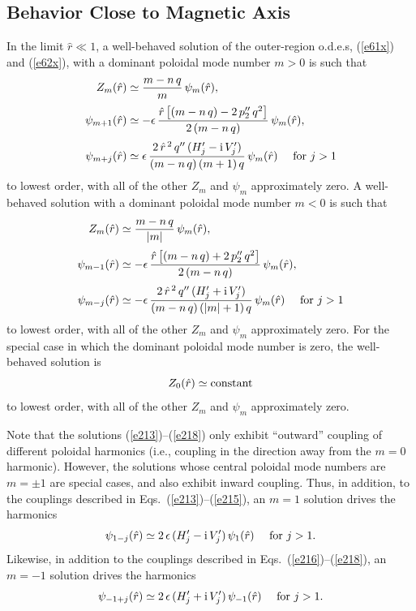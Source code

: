 \documentclass[12pt,prb,aps]{revtex4-1}
\begin{document}
\subsection{Behavior Close to Magnetic Axis}\label{axis}
In the limit $\hat{r}\ll 1$,  a well-behaved solution of the outer-region o.d.e.s, (\ref{e61x}) and (\ref{e62x}), with a dominant poloidal
mode number $m>0$ is such that\,\cite{am1}
\begin{align}\label{e213}
Z_m(\hat{r})&\simeq \frac{m-n\,q}{m}\,\psi_m(\hat{r}),\\[0.5ex]
\psi_{m+1}(\hat{r})&\simeq- \epsilon\,\frac{\hat{r}\left[(m-n\,q)-2\,p_2''\,q^2\right]}{2\,(m-n\,q)}\,\psi_m(\hat{r}),\\[0.5ex]
\psi_{m+j} (\hat{r})&\simeq 
\epsilon\,\frac{2\,\hat{r}^{\,2}\,q''\,(H_j'-{\rm i}\,V_j')}{(m-n\,q)\,(m+1)\,q}\,\psi_m(\hat{r})\mbox{~~~~for $j>1$}\label{e215}
\end{align}
to lowest order, with all of the other $Z_m$ and $\psi_m$ approximately zero. 
A well-behaved solution with a dominant poloidal mode number $m<0$ is such that 
\begin{align}
Z_m(\hat{r})&\simeq \frac{m-n\,q}{|m|}\,\psi_m(\hat{r}),\label{e216}\\[0.5ex]
\psi_{m-1}(\hat{r})&\simeq -\epsilon\,\frac{\hat{r}\left[(m-n\,q)+2\,p_2''\,q^2\right]}{2\,(m-n\,q)}\,\psi_m(\hat{r}),\\[0.5ex]
\psi_{m-j} (\hat{r})&\simeq 
-\epsilon\,\frac{2\,\hat{r}^{\,2}\,q''\,(H_j'+{\rm i}\,V_j')}{(m-n\,q)\,(|m|+1)\,q}\,\psi_m(\hat{r})\mbox{~~~~for $j>1$}\label{e218}
\end{align}
to lowest order, with all of the other $Z_m$ and $\psi_m$ approximately zero. For the special case in which the dominant poloidal
mode number is zero, the well-behaved solution is
\begin{equation}
Z_0(\hat{r})\simeq {\rm constant}
\end{equation}
to lowest order, with all of the other $Z_m$ and $\psi_m$ approximately zero. 

Note that the solutions (\ref{e213})--(\ref{e218}) only exhibit ``outward'' coupling of different poloidal harmonics
(i.e., coupling in the direction away from the $m=0$ harmonic). However, the solutions whose central poloidal
mode numbers are $m=\pm 1$ are special cases, and also exhibit inward coupling. Thus, in addition, to the
couplings described in Eqs.~(\ref{e213})--(\ref{e215}), an $m=1$ solution drives the harmonics
\begin{equation}
\psi_{1-j}(\hat{r})\simeq 2\,\epsilon\,(H_j'-{\rm i}\,V_j')\,\psi_1(\hat{r})\mbox{~~~~for $j>1$}.
\end{equation}
Likewise, in addition to the couplings described in Eqs.~(\ref{e216})--(\ref{e218}), an $m=-1$ solution drives the
harmonics
\begin{equation}
\psi_{-1+j}(\hat{r})\simeq 2\,\epsilon\,(H_j'+{\rm i}\,V_j')\,\psi_{-1}(\hat{r})\mbox{~~~~for $j>1$}.
\end{equation}
\end{document}
